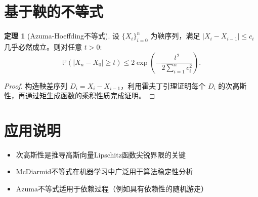 \documentclass{article}
\theoremstyle{definition}
\newtheorem{theorem}{定理}
\renewcommand{\P}{\mathbb{P}}
\newcommand{\1}{\mathbf{1}}
\begin{document}
\section{基于鞅的不等式}

\begin{theorem}[Azuma-Hoeffding不等式]
设 \( \{X_i\}_{i=0}^n \) 为鞅序列，满足 \( |X_i - X_{i-1}| \leq c_i \) 几乎必然成立。则对任意 \( t > 0 \):
\[
\P(|X_n - X_0| \geq t) \leq 2 \exp\left(-\frac{t^2}{2 \sum_{i=1}^n c_i^2}\right).
\]
\end{theorem}

\begin{proof}
构造鞅差序列 \( D_i = X_i - X_{i-1} \)，利用霍夫丁引理证明每个 \( D_i \) 的次高斯性，再通过矩生成函数的乘积性质完成证明。
\end{proof}

\section{应用说明}
\begin{itemize}
\item 次高斯性是推导高斯向量Lipschitz函数尖锐界限的关键
\item McDiarmid不等式在机器学习中广泛用于算法稳定性分析
\item Azuma不等式适用于依赖过程（例如具有依赖性的随机游走）
\end{itemize}
\end{document}
